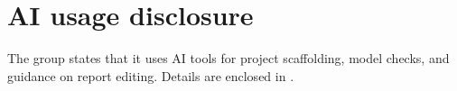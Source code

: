 \documentclass[a4paper,11pt]{article}
\begin{document}



\clearpage
\tableofcontents
\clearpage


\clearpage


\clearpage

\section*{AI usage disclosure}
The group states that it uses AI tools for project scaffolding, model checks,
and guidance on report editing. Details are enclosed in .


\end{document}
